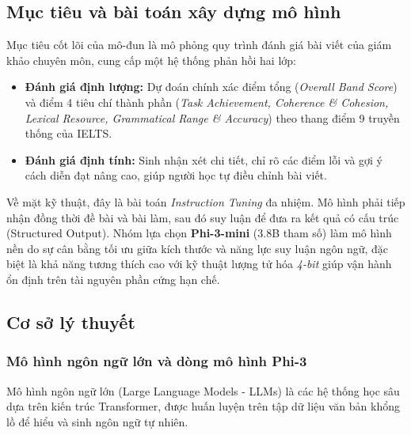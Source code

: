 \subsection{Mục tiêu và bài toán xây dựng mô hình}
Mục tiêu cốt lõi của mô-đun là mô phỏng quy trình đánh giá bài viết của giám khảo chuyên môn, cung cấp một hệ thống phản hồi hai lớp:
\begin{itemize}
    \item \textbf{Đánh giá định lượng:} Dự đoán chính xác điểm tổng (\textit{Overall Band Score}) và điểm 4 tiêu chí thành phần (\textit{Task Achievement, Coherence \& Cohesion, Lexical Resource, Grammatical Range \& Accuracy}) theo thang điểm 9 truyền thống của IELTS.
    \item \textbf{Đánh giá định tính:} Sinh nhận xét chi tiết, chỉ rõ các điểm lỗi và gợi ý cách diễn đạt nâng cao, giúp người học tự điều chỉnh bài viết.
\end{itemize}

Về mặt kỹ thuật, đây là bài toán \textit{Instruction Tuning} đa nhiệm. Mô hình phải tiếp nhận đồng thời đề bài và bài làm, sau đó suy luận để đưa ra kết quả có cấu trúc (Structured Output). Nhóm lựa chọn \textbf{Phi-3-mini} (3.8B tham số) \cite{phi3_microsoft} làm mô hình nền do sự cân bằng tối ưu giữa kích thước và năng lực suy luận ngôn ngữ, đặc biệt là khả năng tương thích cao với kỹ thuật lượng tử hóa \textit{4-bit} giúp vận hành ổn định trên tài nguyên phần cứng hạn chế.

\subsection{Cơ sở lý thuyết}

\subsubsection{Mô hình ngôn ngữ lớn và dòng mô hình Phi-3}
Mô hình ngôn ngữ lớn (Large Language Models - LLMs) là các hệ thống học sâu dựa trên kiến trúc Transformer, được huấn luyện trên tập dữ liệu văn bản khổng lồ để hiểu và sinh ngôn ngữ tự nhiên. 


